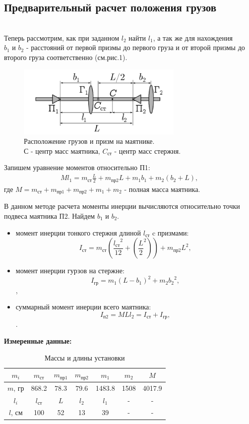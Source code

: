 \subsection*{Предварительный расчет положения грузов} \\[6pt]
\normalsize{Теперь рассмотрим, как при заданном $l_2$ найти $l_1$, а так же 
для нахождения $b_1 \text{ и } b_2$ - расстояний от первой призмы до первого 
груза и от второй призмы до второго груза соответственно (см.рис.1).}
\begin{figure}[ht]
  \centering
  \includegraphics[width=8cm]{рис-1.png}
  \centering
  \caption{Расположение грузов и призм на маятнике.\\С - центр масс маятника, $C_{\text{ст}}$ - центр масс стержня.}
\end{figure}
\normalsize{Запишем уравнение моментов относительно П1:}
\begin{align}
    Ml_1 = m_{\text{ст}}\frac{L}{2}+m_{\text{пр2}}L+m_1b_1+m_2(b_2+L)\text{,}
\end{align}
где $M = m_{\text{ст}}+m_{\text{пр1}}+m_{\text{пр2}}+m_1+m_2$ - полная масса маятника.

В данном методе расчета моменты инерции вычисляются относительно точки подвеса маятника П2. Найдем $b_1 \text{ и } b_2$.\\
\begin{itemize}
    \item{момент инерции тонкого стержня длиной $l_{\text{ст}}$ c призмами:}
        $$I_{\text{ст}} = m_{\text{ст}}\left(\frac{{l_{\text{ст}}}^2}{12}+\left({\frac{L}{2}}^2\right)\right)+m_{\text{пр2}}L^2\text{,}$$
    \item{момент инерции гурзов на стержне:}
        $$I_{\text{гр}} = m_1(L-b_1)^2+m_2{b_2}^2\text{,}$$,
    \item{суммарный момент инерции всего маятника:}
        $$I_{\text{п2}} = MLl_2 = I_{\text{ст}}+I_{\text{гр}}\text{,}$$.
\end{itemize}
\textbf{Измеренные данные:}
\begin{table}[H]
    \centering
    \begin{tabular}{|c|c|c|c|c|c|c|}
        \hline
        $m_i$ & $m_{\text{ст}}$ & $m_{\text{пр1}}$ & $m_{\text{пр2}}$ & $m_1$ & $m_2$ & $M$ \\ \hline
        $m$, гр & 868.2 & 78.3 & 79.6 & 1483.8 & 1508 & 4017.9\\ \hline
        $l_i$ & $l_{\text{ст}}$ & $L$ & $l_2$ & $l_1$ & - & -\\ \hline
        $l$, см & 100 & 52 & 13 & 39 & - & - \\ \hline
    \end{tabular}
    \caption{Массы и длины установки}
    \label{tab:my_labe_1}
\end{table}

